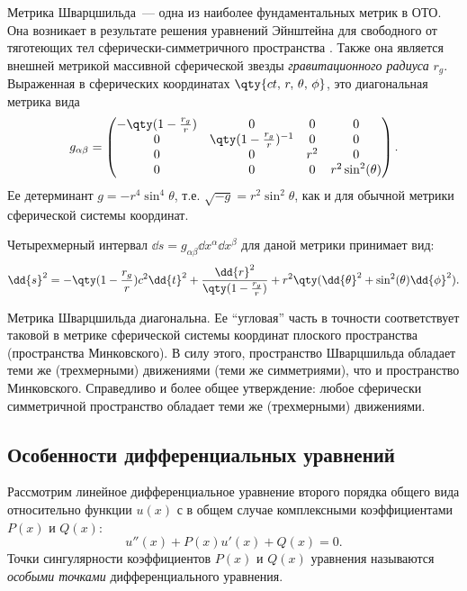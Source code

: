 \documentclass[\docroot/reports/draft/report.tex]{subfiles}
\begin{document}
    Метрика Шварцшильда~--- одна из наиболее фундаментальных метрик в ОТО. Она возникает в результате решения уравнений Эйнштейна для свободного от тяготеющих тел сферически-симметричного пространства \cite{schwarzschild_free_space_rus,mtw_v2}. Также она является внешней метрикой массивной сферической звезды \textit{гравитационного радиуса} $r_g$. Выраженная в сферических координатах $\qty{ct,\,r,\,\theta,\,\phi}$, это диагональная метрика вида
    \begin{equation*}
        g_{\alpha\beta} = \begin{pmatrix}
            -\qty(1 - \frac{r_g}{r}) & 0 & 0 & 0 \\
            0 & \qty(1 - \frac{r_g}{r})^{-1} & 0 & 0 \\
            0 & 0 & r^2 & 0 \\
            0 & 0 & 0 & r^2 \sin^2(\theta)
        \end{pmatrix} .
    \end{equation*}
    Ее детерминант $g = -r^4 \sin^4\theta$, т.е. $\sqrt{-g} = r^2 \sin^2\theta$, как и для обычной метрики сферической системы координат.

    Четырехмерный интервал $\dd{s} = g_{\alpha\beta} \dd{x^\alpha}\dd{x^\beta}$ для даной метрики принимает вид:
    \begin{equation*}
        \dd{s}^2 = -\qty(1 - \frac{r_g}{r}) c^2 \dd{t}^2
            + \frac{\dd{r}^2}{\qty(1 - \frac{r_g}{r})}
            + r^2 \qty(\dd{\theta}^2 + \sin^2(\theta) \dd{\phi}^2) .
    \end{equation*}

    Метрика Шварцшильда диагональна. Ее \enquote{угловая} часть в точности соответствует таковой в метрике сферической системы координат плоского пространства (пространства Минковского). В силу этого, пространство Шварцшильда обладает теми же (трехмерными) движениями (теми же симметриями), что и пространство Минковского. Справедливо и более общее утверждение: любое сферически симметричной пространство обладает теми же (трехмерными) движениями.

\subsection{Особенности дифференциальных уравнений}\label{sec:deq_sing}

    Рассмотрим линейное дифференциальное уравнение второго порядка общего вида относительно функции $u(x)$ с в общем случае комплексными коэффициентами $P(x)$ и $Q(x)$:
    \begin{equation}\label{eq:deq_init}
        u''(x) + P(x) u'(x) + Q(x) = 0.
    \end{equation}
    Точки сингулярности коэффициентов $P(x)$ и $Q(x)$ уравнения называются \textit{особыми точками} дифференциального уравнения.
\end{document}
